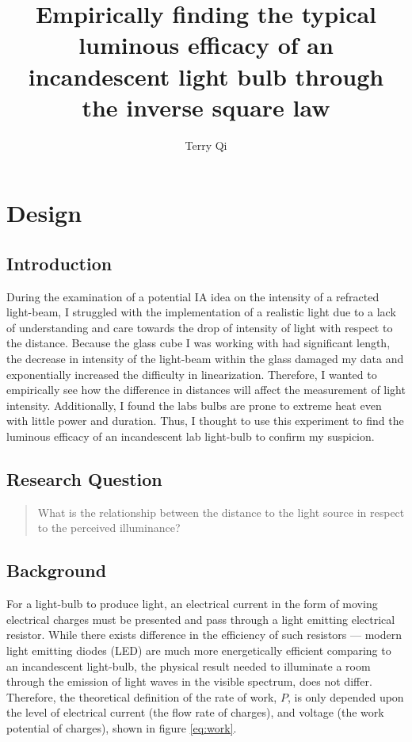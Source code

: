 \documentclass[a4paper,12pt]{article}
\title{Empirically finding the typical luminous efficacy of an incandescent light bulb through the inverse square law}
\author{Terry Qi}
\begin{document}
\maketitle

\section{Design}

\subsection{Introduction}
During the examination of a potential IA idea on the intensity of a refracted light-beam, I struggled with the implementation of a realistic light due to a lack of understanding and care towards the drop of intensity of light with respect to the distance. Because the glass cube I was working with had significant length, the decrease in intensity of the light-beam within the glass damaged my data and exponentially increased the difficulty in linearization. Therefore, I wanted to empirically see how the difference in distances will affect the measurement of light intensity. Additionally, I found the labs bulbs are prone to extreme heat even with little power and duration. Thus, I thought to use this experiment to find the luminous efficacy of an incandescent lab light-bulb to confirm my suspicion.

\subsection{Research Question}
\begin{quote}
 What is the relationship between the distance to the light source in respect to the perceived illuminance?
\end{quote}

\subsection{Background}

For a light-bulb to produce light, an electrical current in the form of moving electrical charges must be presented and pass through a light emitting electrical resistor. While there exists difference in the efficiency of such resistors --- modern light emitting diodes (LED) are much more energetically efficient comparing to an incandescent light-bulb, the physical result needed to illuminate a room through the emission of light waves in the visible spectrum, does not differ. Therefore, the theoretical definition of the rate of work, $P$, is only depended upon the level of electrical current (the flow rate of charges), and voltage (the work potential of charges), shown in figure \ref{eq:work}.
\end{document}
